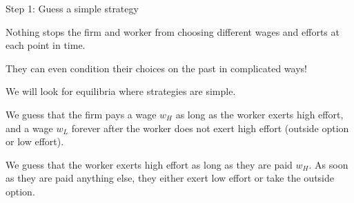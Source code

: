 \documentclass[aspectratio=169,usenames,dvipsnames]{beamer}
\newenvironment{wideitemize}{\itemize\addtolength{\itemsep}{10pt}}{\enditemize}
\begin{document}
\begin{frame}{Step 1: Guess a simple strategy}
\begin{wideitemize}
    \item Nothing stops the firm and worker from choosing different wages and efforts at each point in time.
    \item They can even condition their choices on the past in complicated ways!
    \item We will look for equilibria where strategies are simple.
    \item We guess that the firm pays a wage $w_H$ as long as the worker exerts high effort, and a wage $w_L$ forever after the worker does not exert high effort (outside option or low effort).    
    \item We guess that the worker exerts high effort as long as they are paid $w_H$. As soon as they are paid anything else, they either exert low effort or take the outside option.
\end{wideitemize}
    
\end{frame}
\end{document}

